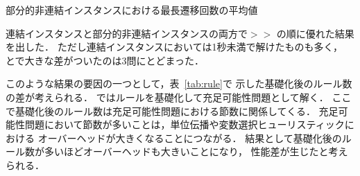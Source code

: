 \begin{table}[htbp]
  \centering
  \caption{部分的非連結インスタンスにおける最長遷移回数の平均値}
  
  \label{tab:ave_unknown}
\end{table}

連結インスタンスと部分的非連結インスタンスの両方で$>$$>$
の順に優れた結果を出した．
ただし連結インスタンスにおいては1秒未満で解けたものも多く，
とで大きな差がついたのは3問にとどまった．

このような結果の要因の一つとして，表~\ref{tab:rule}で
示した基礎化後のルール数の差が考えられる．
{\clingo}ではルールを基礎化して充足可能性問題として解く．
ここで基礎化後のルール数は充足可能性問題における節数に関係してくる．
充足可能性問題において節数が多いことは，単位伝播や変数選択ヒューリスティックにおける
オーバーヘッドが大きくなることにつながる．
結果として基礎化後のルール数が多いほどオーバーヘッドも大きいことになり，
性能差が生じたと考えられる．

%

